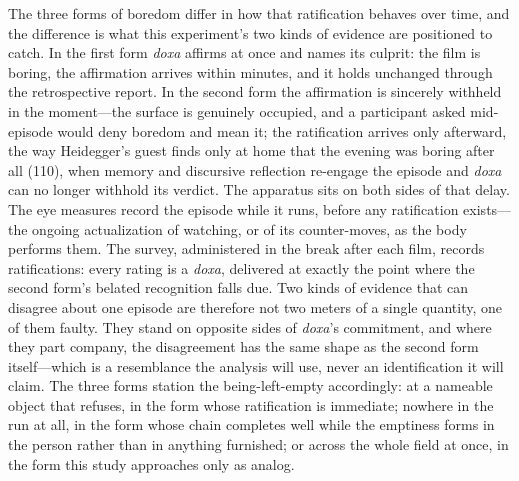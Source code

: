 The three forms of boredom differ in how that ratification behaves over time, and the
difference is what this experiment's two kinds of evidence are positioned to catch. In the
first form \textit{doxa} affirms at once and names its culprit: the film is boring, the
affirmation arrives within minutes, and it holds unchanged through the retrospective report. In
the second form the affirmation is sincerely withheld in the moment---the surface is genuinely
occupied, and a participant asked mid-episode would deny boredom and mean it; the ratification
arrives only afterward, the way Heidegger's guest finds only at home that the evening was
boring after all (110), when memory and discursive reflection re-engage the episode and
\textit{doxa} can no longer withhold its verdict. The apparatus sits on both sides of that
delay. The eye measures record the episode while it runs, before any ratification exists---the
ongoing actualization of watching, or of its counter-moves, as the body performs them. The
survey, administered in the break after each film, records ratifications: every rating is a
\textit{doxa}, delivered at exactly the point where the second form's belated recognition falls
due. Two kinds of evidence that can disagree about one episode are therefore not two meters of
a single quantity, one of them faulty. They stand on opposite sides of \textit{doxa}'s
commitment, and where they part company, the disagreement has the same shape as the second form
itself---which is a resemblance the analysis will use, never an identification it will claim.
The three forms station the being-left-empty accordingly: at a nameable object that refuses, in
the form whose ratification is immediate; nowhere in the run at all, in the form whose chain
completes well while the emptiness forms in the person rather than in anything furnished; or
across the whole field at once, in the form this study approaches only as analog.

